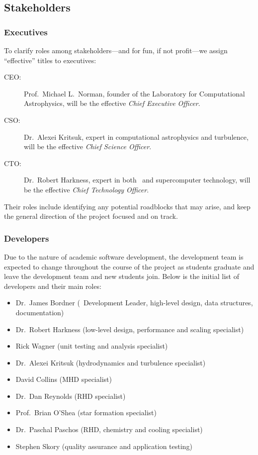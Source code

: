 \documentclass[11pt]{article}
\begin{document}
\subsection{Stakeholders}

\subsubsection{Executives}

    To clarify roles among stakeholders---and for fun, if not
    profit---we assign ``effective'' titles to executives:

\begin{description}
%
    \item[CEO:] Prof.~Michael L.~Norman, founder of the Laboratory for
      Computational Astrophysics, will be the effective \textit{Chief
        Executive Officer}.
%
    \item[CSO: ] Dr.~Alexei Kritsuk, expert in computational
      astrophysics and turbulence, will be the effective \textit{Chief
        Science Officer}.
%
    \item[CTO: ] Dr.~Robert Harkness, expert in both \enzo\ and supercomputer
    technology, will be the effective \textit{Chief Technology
    Officer}.
%
\end{description}

   Their roles include identifying any potential roadblocks that may
   arise, and keep the general direction of the project focused and on
   track.

\subsubsection{Developers}

   Due to the nature of academic software development, the development
   team is expected to change throughout the course of the project as
   students graduate and leave the development team and new students
   join.  Below is the initial list of developers and their main roles:

\begin{itemize}
    \item Dr.~James Bordner (\cello\ Development Leader, high-level design, data structures, documentation)
    \item Dr.~Robert Harkness (low-level design, performance and scaling specialist)
    \item Rick Wagner (unit testing and analysis specialist)
    \item Dr.~Alexei Kritsuk (hydrodynamics and turbulence specialist)
    \item David Collins (MHD specialist)
    \item Dr.~Dan Reynolds (RHD specialist)
    \item Prof.~Brian O'Shea (star formation specialist)
    \item Dr.~Paschal Paschos (RHD, chemistry and cooling specialist)
    \item Stephen Skory (quality assurance and application testing)
\end{itemize}
\end{document}
